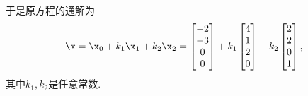 \begin{example}
\begin{solution}
于是原方程的通解为\[
\x = \x_0 + k_1 \x_1 + k_2 \x_2
= \begin{bmatrix} -2 \\ -3 \\ 0 \\ 0 \end{bmatrix}
+ k_1 \begin{bmatrix} 4 \\ 1 \\ 2 \\ 0 \end{bmatrix}
+ k_2 \begin{bmatrix} 2 \\ 2 \\ 0 \\ 1 \end{bmatrix},
\]其中\(k_1,k_2\)是任意常数.
\end{solution}
\end{example}

